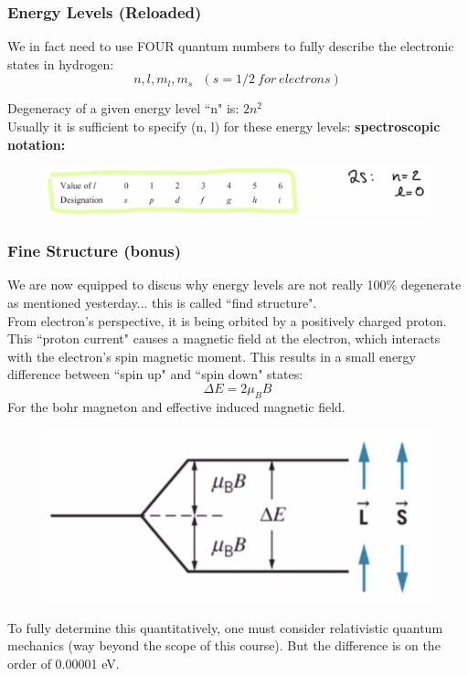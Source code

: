 \documentclass[class=article,crop=false]{standalone}
\begin{document}
\subsubsection{Energy Levels (Reloaded)}
We in fact need to use FOUR quantum numbers to fully describe the electronic states in hydrogen:
$$ n, l, m_l, m_s \ \ \ (s = 1/2\ for\ electrons)$$

Degeneracy of a given energy level ``n" is: $ 2n^2 $ \\

Usually it is sufficient to specify (n, l) for these energy levels: \textbf{spectroscopic notation:}

\begin{figure}[h!]
	\centering
	\includegraphics[width=.45\linewidth]{./Images/spectroscopic.png}
	\caption{}
\end{figure}

\subsubsection{Fine Structure (bonus)}
We are now equipped to discus why energy levels are not really 100\% degenerate as mentioned yesterday... this is called ``find structure".\\

From electron's perspective, it is being orbited by a positively charged proton. This ``proton current" causes a magnetic field at the electron, which interacts with the electron's spin magnetic moment. This results in a small energy difference between ``spin up" and ``spin down" states: \\

$$ \Delta E = 2 \mu_B B $$
For the bohr magneton and effective induced magnetic field. \\
\begin{figure}[h!]
	\centering
	\includegraphics[width=.25\linewidth]{./Images/non-degeneracy.png}
	\caption{}
\end{figure}
To fully determine this quantitatively, one must consider relativistic quantum mechanics (way beyond the scope of this course). But the difference is on the order of 0.00001 eV.
\end{document}

